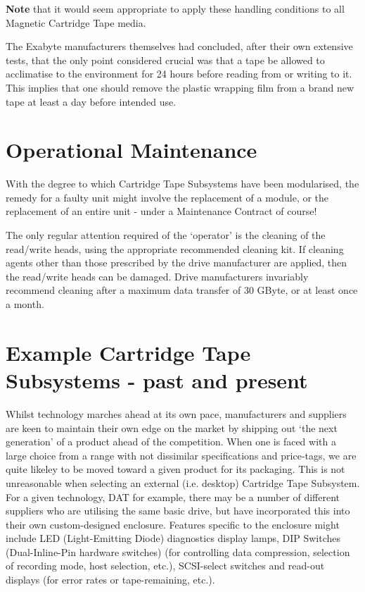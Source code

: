 {\bf Note} that it would seem appropriate to apply these handling conditions to
all Magnetic Cartridge Tape media.

The Exabyte manufacturers themselves had concluded, after their own extensive
tests, that the only point considered crucial was that a tape be allowed to
acclimatise to the environment for 24 hours before reading from or writing
to it. This implies that one should remove the plastic wrapping film from a
brand new tape at least a day before intended use.

\section {Operational Maintenance}

With the degree to which Cartridge Tape Subsystems have been modularised,
the remedy for a faulty unit might involve the replacement of a module, or
the replacement of an entire unit - under a Maintenance Contract of course!

The only regular attention required of the `operator' is the cleaning of the
read/write heads, using the appropriate recommended cleaning kit. If cleaning
agents other than those prescribed by the drive manufacturer are applied,
then the read/write heads can be damaged. Drive manufacturers invariably
recommend cleaning after a maximum data transfer of 30 GByte, or at least
once a month.

\section {Example Cartridge Tape Subsystems - past and present}

Whilst technology marches ahead at its own pace, manufacturers and suppliers
are keen to maintain their own edge on the market by shipping out `the next
generation' of a product ahead of the competition. When one is faced with a
large choice from a range with not dissimilar specifications and price-tags,
we are quite likeley to be moved toward a given product for its packaging.
This is not unreasonable when selecting an external (i.e. desktop) Cartridge
Tape Subsystem. For a given technology, DAT for example, there may be a
number of different suppliers who are utilising the same basic drive, but
have incorporated this into their own custom-designed enclosure. Features
specific to the enclosure might include LED (Light-Emitting Diode) diagnostics
display lamps, DIP Switches (Dual-Inline-Pin hardware switches) (for
controlling data compression, selection of recording mode, host selection,
etc.), SCSI-select switches and read-out displays (for error rates or
tape-remaining, etc.).

